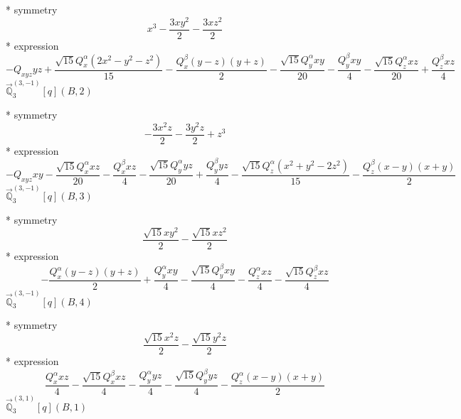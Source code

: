 \documentclass[fleqn,8pt]{jsarticle}
\begin{document}
\noindent\quad ** symmetry
\begin{dmath*}
x^{3} - \frac{3 x y^{2}}{2} - \frac{3 x z^{2}}{2}
\end{dmath*}
\noindent\quad ** expression
\begin{dmath*}
- Q_{xyz} y z + \frac{\sqrt{15} Q_{x}^{\alpha} \left(2 x^{2} - y^{2} - z^{2}\right)}{15} - \frac{Q_{x}^{\beta} \left(y - z\right) \left(y + z\right)}{2} - \frac{\sqrt{15} Q_{y}^{\alpha} x y}{20} - \frac{Q_{y}^{\beta} x y}{4} - \frac{\sqrt{15} Q_{z}^{\alpha} x z}{20} + \frac{Q_{z}^{\beta} x z}{4}
\end{dmath*}
\noindent\quad $\vec{\mathbb{Q}}_{3}^{(3,-1)}[q](B,2)$

\noindent\quad ** symmetry
\begin{dmath*}
- \frac{3 x^{2} z}{2} - \frac{3 y^{2} z}{2} + z^{3}
\end{dmath*}
\noindent\quad ** expression
\begin{dmath*}
- Q_{xyz} x y - \frac{\sqrt{15} Q_{x}^{\alpha} x z}{20} - \frac{Q_{x}^{\beta} x z}{4} - \frac{\sqrt{15} Q_{y}^{\alpha} y z}{20} + \frac{Q_{y}^{\beta} y z}{4} - \frac{\sqrt{15} Q_{z}^{\alpha} \left(x^{2} + y^{2} - 2 z^{2}\right)}{15} - \frac{Q_{z}^{\beta} \left(x - y\right) \left(x + y\right)}{2}
\end{dmath*}
\noindent\quad $\vec{\mathbb{Q}}_{3}^{(3,-1)}[q](B,3)$

\noindent\quad ** symmetry
\begin{dmath*}
\frac{\sqrt{15} x y^{2}}{2} - \frac{\sqrt{15} x z^{2}}{2}
\end{dmath*}
\noindent\quad ** expression
\begin{dmath*}
- \frac{Q_{x}^{\alpha} \left(y - z\right) \left(y + z\right)}{2} + \frac{Q_{y}^{\alpha} x y}{4} - \frac{\sqrt{15} Q_{y}^{\beta} x y}{4} - \frac{Q_{z}^{\alpha} x z}{4} - \frac{\sqrt{15} Q_{z}^{\beta} x z}{4}
\end{dmath*}
\noindent\quad $\vec{\mathbb{Q}}_{3}^{(3,-1)}[q](B,4)$

\noindent\quad ** symmetry
\begin{dmath*}
\frac{\sqrt{15} x^{2} z}{2} - \frac{\sqrt{15} y^{2} z}{2}
\end{dmath*}
\noindent\quad ** expression
\begin{dmath*}
\frac{Q_{x}^{\alpha} x z}{4} - \frac{\sqrt{15} Q_{x}^{\beta} x z}{4} - \frac{Q_{y}^{\alpha} y z}{4} - \frac{\sqrt{15} Q_{y}^{\beta} y z}{4} - \frac{Q_{z}^{\alpha} \left(x - y\right) \left(x + y\right)}{2}
\end{dmath*}
\noindent\quad $\vec{\mathbb{Q}}_{3}^{(3,1)}[q](B,1)$
\end{document}
